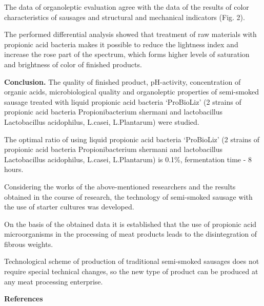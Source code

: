 \begin{multicols}{2}
The data of organoleptic evaluation agree with the data of the results
of color characteristics of sausages and structural and mechanical
indicators (Fig. 2).

The performed differential analysis showed that treatment of raw
materials with propionic acid bacteria makes it possible to reduce the
lightness index and increase the rose part of the spectrum, which forms
higher levels of saturation and brightness of color of finished
products.

{\bfseries Conclusion.} The quality of finished product, pH-activity,
concentration of organic acids, microbiological quality and organoleptic
properties of semi-smoked sausage treated with liquid propionic acid
bacteria `ProBioLiz' (2 strains of propionic acid bacteria
Propionibacterium shermani and lactobacillus Lactobacillus acidophilus,
L.casei, L.Plantarum) were studied.

The optimal ratio of using liquid propionic acid bacteria `ProBioLiz' (2
strains of propionic acid bacteria Propionibacterium shermani and
lactobacillus Lactobacillus acidophilus, L.casei, L.Plantarum) is 0.1\%,
fermentation time - 8 hours.

Considering the works of the above-mentioned researchers and the results
obtained in the course of research, the technology of semi-smoked
sausage with the use of starter cultures was developed.

On the basis of the obtained data it is established that the use of
propionic acid microorganisms in the processing of meat products leads
to the disintegration of fibrous weights.

Technological scheme of production of traditional semi-smoked sausages
does not require special technical changes, so the new type of product
can be produced at any meat processing enterprise.
\end{multicols}

\begin{center}
{\bfseries References}
\end{center}

